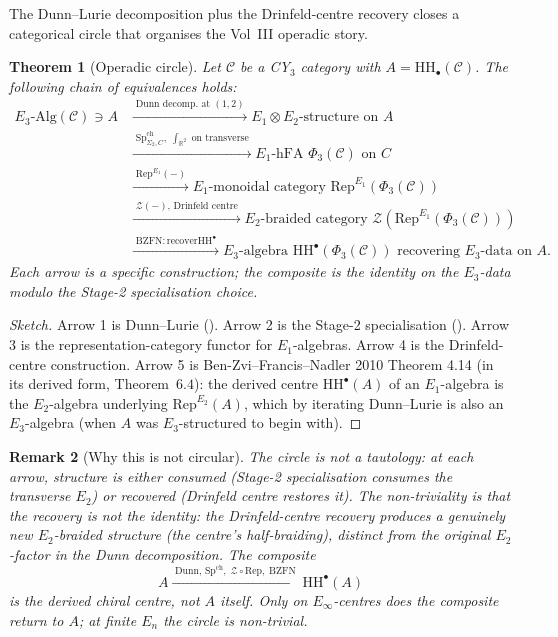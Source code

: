 \documentclass[11pt]{article}
\newtheorem{theorem}{Theorem}[section]
\newtheorem{remark}[theorem]{Remark}
\newcommand{\Eone}{E_{1}}
\newcommand{\Etwo}{E_{2}}
\newcommand{\R}{\mathbb{R}}
\newcommand{\HH}{\mathrm{HH}}
\newcommand{\SpCh}{\mathrm{Sp}^{\mathrm{ch}}}
\newcommand{\cC}{\mathcal{C}}
\newcommand{\cZ}{\mathcal{Z}}
\newcommand{\Rep}{\mathrm{Rep}}
\begin{document}
The Dunn--Lurie decomposition plus the Drinfeld-centre recovery closes a
categorical circle that organises the Vol~III operadic story.

\begin{theorem}[Operadic circle]
\label{thm:operadic-circle}
Let $\cC$ be a CY$_{3}$ category with $A = \HH_{\bullet}(\cC)$. The
following chain of equivalences holds:
\begin{align*}
  E_{3}\text{-}\mathrm{Alg}(\cC)\ni A
  & \xrightarrow{\;\text{Dunn decomp. at } (1, 2)\;}
    E_{1} \otimes E_{2}\text{-structure on } A \\
  & \xrightarrow{\;\SpCh_{\Sigma_{2}, C},
    \;\int_{\R^{2}} \text{ on transverse}\;}
    E_{1}\text{-hFA } \Phi_{3}(\cC) \text{ on } C \\
  & \xrightarrow{\;\Rep^{E_{1}}(-)\;}
    E_{1}\text{-monoidal category } \Rep^{\Eone}(\Phi_{3}(\cC)) \\
  & \xrightarrow{\;\cZ(-)\text{, Drinfeld centre}\;}
    E_{2}\text{-braided category } \cZ(\Rep^{\Eone}(\Phi_{3}(\cC))) \\
  & \xrightarrow{\;\mathrm{BZFN: recover }\HH^{\bullet}\;}
    E_{3}\text{-algebra } \HH^{\bullet}(\Phi_{3}(\cC)) \text{ recovering }
    E_{3}\text{-data on } A.
\end{align*}
Each arrow is a specific construction; the composite is the identity on
the $E_{3}$-data modulo the Stage-2 specialisation choice.
\end{theorem}

\begin{proof}[Sketch]
Arrow 1 is Dunn--Lurie (). Arrow 2 is the Stage-2
specialisation (). Arrow 3 is the
representation-category functor for $E_{1}$-algebras. Arrow 4 is the
Drinfeld-centre construction. Arrow 5 is Ben-Zvi--Francis--Nadler 2010
Theorem 4.14 (in its derived form, Theorem~$6.4$): the derived centre
$\HH^{\bullet}(A)$ of an $E_{1}$-algebra is the $E_{2}$-algebra
underlying $\Rep^{E_{2}}(A)$, which by iterating Dunn--Lurie is also an
$E_{3}$-algebra (when $A$ was $E_{3}$-structured to begin with).
\end{proof}

\begin{remark}[Why this is not circular]
The circle is not a tautology: at each arrow, structure is either
consumed (Stage-2 specialisation consumes the transverse $E_{2}$) or
recovered (Drinfeld centre restores it). The non-triviality is that the
recovery is \emph{not} the identity: the Drinfeld-centre recovery
produces a genuinely new $E_{2}$-braided structure (the \emph{centre}'s
half-braiding), distinct from the original $\Etwo$-factor in the Dunn
decomposition. The composite
\[
  A \xrightarrow{\;\text{Dunn, }\SpCh,\;\cZ\circ \Rep,\;\mathrm{BZFN}\;}
  \HH^{\bullet}(A)
\]
is the derived chiral centre, not $A$ itself. Only on $E_{\infty}$-centres
does the composite return to $A$; at finite $E_{n}$ the circle is
non-trivial.
\end{remark}
\end{document}
